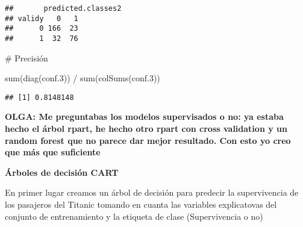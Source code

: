\documentclass[
]{article}
\newenvironment{Shaded}{\begin{snugshade}}{\end{snugshade}}
\newcommand{\CommentTok}[1]{\textcolor[rgb]{0.50,0.62,0.50}{#1}}
\newcommand{\DataTypeTok}[1]{\textcolor[rgb]{0.87,0.87,0.75}{#1}}
\newcommand{\DecValTok}[1]{\textcolor[rgb]{0.86,0.86,0.80}{#1}}
\newcommand{\FloatTok}[1]{\textcolor[rgb]{0.75,0.75,0.82}{#1}}
\newcommand{\KeywordTok}[1]{\textcolor[rgb]{0.94,0.87,0.69}{#1}}
\newcommand{\NormalTok}[1]{\textcolor[rgb]{0.80,0.80,0.80}{#1}}
\newcommand{\OperatorTok}[1]{\textcolor[rgb]{0.94,0.94,0.82}{#1}}
\newcommand{\StringTok}[1]{\textcolor[rgb]{0.80,0.58,0.58}{#1}}
\begin{document}
\begin{Shaded}
\end{Shaded}

\begin{verbatim}
##       predicted.classes2
## validy   0   1
##      0 166  23
##      1  32  76
\end{verbatim}

\begin{Shaded}
\begin{Highlighting}[]
\CommentTok{# Precisión}

\KeywordTok{sum}\NormalTok{(}\KeywordTok{diag}\NormalTok{(conf}\FloatTok{.3}\NormalTok{)) }\OperatorTok{/}\StringTok{ }\KeywordTok{sum}\NormalTok{(}\KeywordTok{colSums}\NormalTok{(conf}\FloatTok{.3}\NormalTok{))}
\end{Highlighting}
\end{Shaded}

\begin{verbatim}
## [1] 0.8148148
\end{verbatim}

\textbf{OLGA: Me preguntabas los modelos supervisados o no: ya estaba
hecho el árbol rpart, he hecho otro rpart con cross validation y un
random forest que no parece dar mejor resultado. Con esto yo creo que
más que suficiente}

\textbf{Árboles de decisión CART}

En primer lugar creamos un árbol de decisión para predecir la
supervivencia de los pasajeros del Titanic tomando en cuanta las
variables explicatovas del conjunto de entrenamiento y la etiqueta de
clase (Supervivencia o no)
\end{document}
